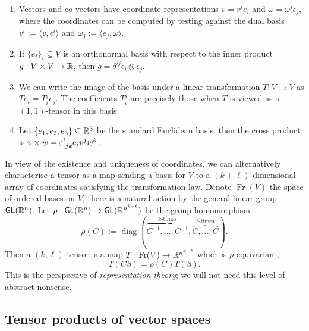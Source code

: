 \begin{example}
\leavevmode
\begin{enumerate}
	\item Vectors and co-vectors have coordinate representations $v = v^i e_i$ and $\omega = \omega^j \epsilon_j$, where the coordinates can be computed by testing against the dual basis $v^i := \langle v, \epsilon^i \rangle$ and $\omega_j := \langle e_j, \omega \rangle$. 
	
	
	\item If $\{e_i\}_i \subseteq V$ is an orthonormal basis with respect to the inner product $g : V \times V \to \mathbb R$, then $g = \delta^{ij} \epsilon_i \otimes \epsilon_j$.
	
	\item We can write the image of the basis under a linear transformation $T: V \to V$ as $Te_i = T^j_i e_j$. The coefficients $T^j_i$ are precisely those when $T$ is viewed as a $(1, 1)$-tensor in this basis. 
	
	\item Let $\{e_1, e_2, e_3\} \subseteq \mathbb R^3$ be the standard Euclidean basis, then the cross product is $v \times w = \epsilon\indices{^i_j_k}  e_i v^j w^k$.
	
\end{enumerate}
\end{example}
	
\begin{remark}
	In view of the existence and uniqueness of coordinates, we can alternatively characterise a tensor as a map sending a basis for $V$ to a $(k + \ell)$-dimensional array of coordinates satisfying the transformation law. Denote $\operatorname{Fr} (V)$ the space of ordered bases on $V$, there is a natural action by the general linear group $\mathsf{GL} (\mathbb R^n)$. Let $\rho : \mathsf{GL} (\mathbb R^n) \to \mathsf{GL} (\mathbb R^{n^{k + \ell}})$ be the group homomorphism 
		\[ 
			\rho(C) 
				:=
				\operatorname{diag} (\overbrace{C^{-1}, \dots, C^{-1}}^{k\text{-times}}, \overbrace{C, \dots, C}^{\ell\text{-times}}).
		\]
	Then a $(k, \ell)$-tensor is a map $T: \operatorname{Fr} (V) \to \mathbb R^{n^{k + \ell}}$ which is $\rho$-equivariant, 
		\[ T(C \beta) = \rho(C) T(\beta). \]
	This is the perspective of \textit{representation theory}; we will not need this level of abstract nonsense. 
	
	\end{remark}	
	
\subsection{Tensor products of vector spaces}

